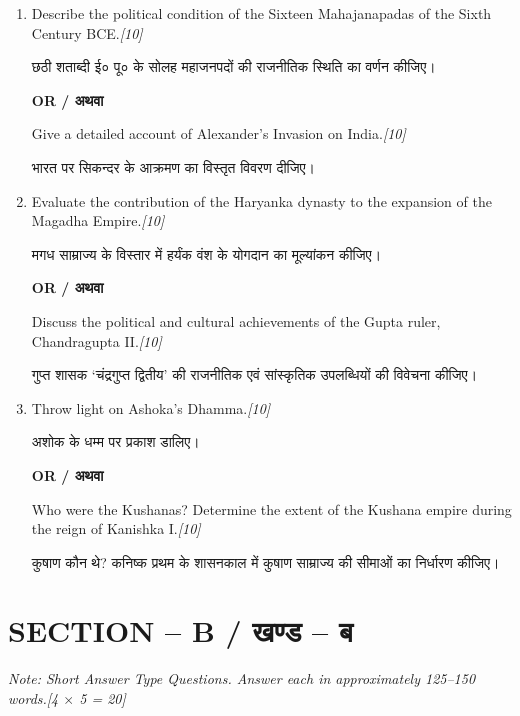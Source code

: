 \documentclass[11pt,a4paper]{article}
\newcommand{\pts}[1]{\hfill \textit{[#1]}}
\begin{document}
\begin{enumerate}[label=\textbf{\arabic*.},leftmargin=*,itemsep=12pt]

  \item Describe the political condition of the Sixteen Mahajanapadas of the Sixth Century BCE.\pts{10}
  
  छठी शताब्दी ई० पू० के सोलह महाजनपदों की राजनीतिक स्थिति का वर्णन कीजिए।

  \begin{center}\textbf{OR / अथवा}\end{center}

  Give a detailed account of Alexander's Invasion on India.\pts{10}
  
  भारत पर सिकन्दर के आक्रमण का विस्तृत विवरण दीजिए।

  \item Evaluate the contribution of the Haryanka dynasty to the expansion of the Magadha Empire.\pts{10}
  
  मगध साम्राज्य के विस्तार में हर्यंक वंश के योगदान का मूल्यांकन कीजिए।

  \begin{center}\textbf{OR / अथवा}\end{center}

  Discuss the political and cultural achievements of the Gupta ruler, Chandragupta II.\pts{10}
  
  गुप्त शासक `चंद्रगुप्त द्वितीय' की राजनीतिक एवं सांस्कृतिक उपलब्धियों की विवेचना कीजिए।

  \item Throw light on Ashoka's Dhamma.\pts{10}
  
  अशोक के धम्म पर प्रकाश डालिए।

  \begin{center}\textbf{OR / अथवा}\end{center}

  Who were the Kushanas? Determine the extent of the Kushana empire during the reign of Kanishka I.\pts{10}
  
  कुषाण कौन थे? कनिष्क प्रथम के शासनकाल में कुषाण साम्राज्य की सीमाओं का निर्धारण कीजिए।

\end{enumerate}

\bigskip

\section*{SECTION -- B / खण्ड -- ब}
\noindent \textit{Note: Short Answer Type Questions. Answer each in approximately 125--150 words.}\pts{4 $\times$ 5 = 20}
\end{document}
